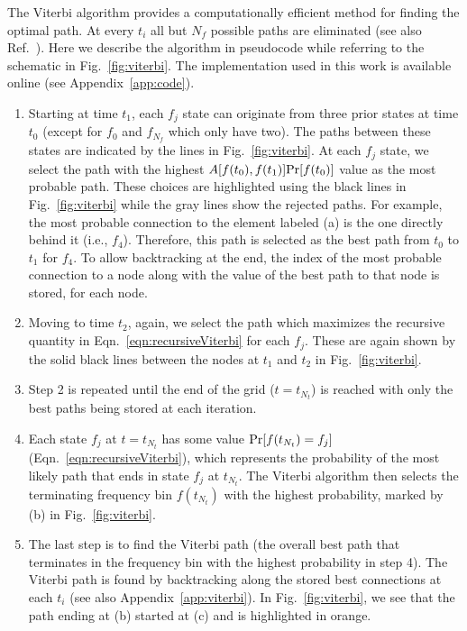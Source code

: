 \documentclass[paper-main.tex]{subfiles}
\begin{document}
The Viterbi algorithm provides a computationally efficient method for finding the optimal path. 
At every $t_i$ all but $N_f$ possible paths are eliminated (see also Ref.~\cite{ScoX1ViterbiO1:2017}). 
Here we describe the algorithm in pseudocode while referring to the schematic in Fig.~\ref{fig:viterbi}.%
The implementation used in this work is available online (see Appendix~\ref{app:code}).
\begin{enumerate}
\item Starting at time $t_1$, each $f_j$ state can originate from three prior states at time $t_0$ (except for $f_0$ and $f_{N_f}$ which only have two). The paths between these states are indicated by the lines in Fig.~\ref{fig:viterbi}. At each $f_j$ state, we select the path with the highest $A[f(t_0),f(t_1)] {\rm Pr}[f(t_0)]$ value as the most probable path. These choices are highlighted using the black lines in Fig.~\ref{fig:viterbi} while the gray lines show the rejected paths. For example, the most probable connection to the element labeled (a) is the one directly behind it (i.e., $f_4$). Therefore, this path is selected as the best path from $t_0$ to $t_1$ for $f_4$. To allow backtracking at the end, the index of the most probable connection to a node along with the value of the best path to that node is stored, for each node.

\item Moving to time $t_2$, again, we select the path which maximizes the recursive quantity in Eqn.~\ref{eqn:recursiveViterbi} for each $f_j$. These are again shown by the solid black lines between the nodes at $t_1$ and $t_2$ in Fig.~\ref{fig:viterbi}.

\item Step 2 is repeated until the end of the grid ($t=t_{N_t}$) is reached with only the best paths being stored at each iteration. 

\item Each state $f_j$ at $t=t_{N_t}$ has some value ${\rm Pr}[f(t_{N_t})=f_j]$ (Eqn.~\ref{eqn:recursiveViterbi}), which represents the probability of the most likely path that ends in state $f_j$ at $t_{N_t}$. The Viterbi algorithm then selects the terminating frequency bin $f(t_{N_t})$ with the highest probability, marked by (b) in Fig.~\ref{fig:viterbi}.

\item The last step is to find the Viterbi path (the overall best path that terminates in the frequency bin with the highest probability in step 4). The Viterbi path is found by backtracking along the stored best connections at each $t_i$ (see also Appendix~\ref{app:viterbi}). In Fig.~\ref{fig:viterbi}, we see that the path ending at (b) started at (c) and is highlighted in orange.
\end{enumerate}
\end{document}
